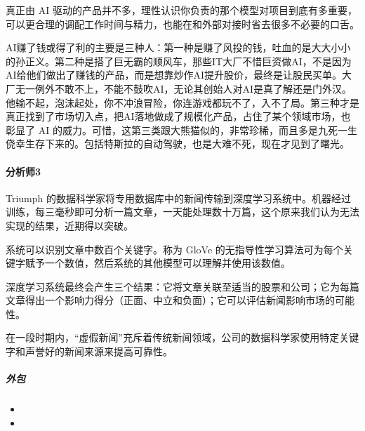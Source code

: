 \documentclass[letterpaper,10pt,english]{sphinxmanual}
\begin{document}
真正由 AI
驱动的产品并不多，理性认识你负责的那个模型对项目到底有多重要，可以更合理的调配工作时间与精力，也能在和外部对接时省去很多不必要的口舌。

AI赚了钱或得了利的主要是三种人：第一种是赚了风投的钱，吐血的是大大小小的孙正义。第二种是搭了巨无霸的顺风车，那些IT大厂不惜巨资做AI，不是因为AI给他们做出了赚钱的产品，而是想靠炒作AI提升股价，最终是让股民买单。大厂无一例外不敢不上，不能不鼓吹AI，无论其创始人对AI是真了解还是门外汉。他输不起，泡沫起处，你不冲浪冒险，你连游戏都玩不了，入不了局。第三种才是真正找到了市场切入点，把AI落地做成了规模化产品，占住了某个领域市场，也彰显了
AI
的威力。可惜，这第三类跟大熊猫似的，非常珍稀，而且多是九死一生侥幸生存下来的。包括特斯拉的自动驾驶，也是大难不死，现在才见到了曙光。


\paragraph{分析师3\sphinxfootnotemark[141]}
\label{\detokenize{chapter_introduction/money:id5}}%
\begin{footnotetext}[141]\sphinxAtStartFootnote
{}
%
\end{footnotetext}\ignorespaces 
Triumph
的数据科学家将专用数据库中的新闻传输到深度学习系统中。机器经过训练，每三毫秒即可分析一篇文章，一天能处理数十万篇，这个原来我们认为无法实现的结果，近期得以突破。

系统可以识别文章中数百个关键字。称为 GloVe
的无指导性学习算法可为每个关键字赋予一个数值，然后系统的其他模型可以理解并使用该数值。

深度学习系统最终会产生三个结果：它将文章关联至适当的股票和公司；它为每篇文章得出一个影响力得分（正面、中立和负面）；它可以评估新闻影响市场的可能性。

在一段时期内，“虚假新闻”充斥着传统新闻领域，公司的数据科学家使用特定关键字和声誉好的新闻来源来提高可靠性。


\subparagraph{外包}
\label{\detokenize{chapter_introduction/money:id6}}\begin{itemize}
\item {} 

\item {} 

\end{itemize}
\end{document}
